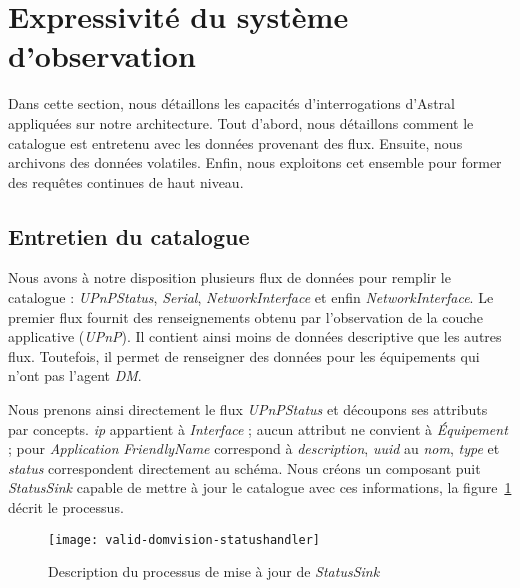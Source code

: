 \section{Expressivité du système d'observation}\label{sec:valid:domvision:requetes}
Dans cette section, nous détaillons les capacités d'interrogations d'Astral appliquées sur notre architecture. Tout d'abord, nous détaillons comment le catalogue est entretenu avec les données provenant des flux. Ensuite, nous archivons des données volatiles. Enfin, nous exploitons cet ensemble pour former des requêtes continues de haut niveau.

\subsection{Entretien du catalogue}
Nous avons à notre disposition plusieurs flux de données pour remplir le catalogue : \textit{UPnPStatus}, \textit{Serial}, \textit{NetworkInterface} et enfin \textit{NetworkInterface}. Le premier flux fournit des renseignements obtenu par l'observation de la couche applicative (\textit{UPnP}). Il contient ainsi moins de données descriptive que les autres flux. Toutefois, il permet de renseigner des données pour les équipements qui n'ont pas l'agent \textit{DM}.

Nous prenons ainsi directement le flux \textit{UPnPStatus} et découpons ses attributs par concepts. \textit{ip} appartient à \textit{Interface} ; aucun attribut ne convient à \textit{Équipement} ; pour \textit{Application} \textit{FriendlyName} correspond à \textit{description}, \textit{uuid} au \textit{nom}, \textit{type} et \textit{status} correspondent directement au schéma. Nous créons un composant puit \textit{StatusSink} capable de mettre à jour le catalogue avec ces informations, la figure~\ref{fig:valid:domvision:statushandler} décrit le processus.

\begin{figure}[ht]
	\texttt{[image: valid-domvision-statushandler]}
	\caption{Description du processus de mise à jour de \textit{StatusSink}}\label{fig:valid:domvision:statushandler}
\end{figure}

